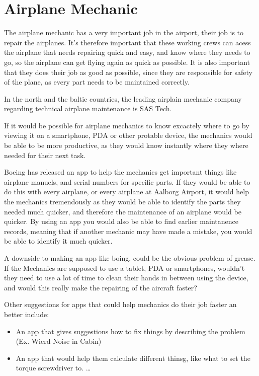 \section{Airplane Mechanic}

The airplane mechanic has a very important job in the airport, their job is to repair the airplanes. It's therefore important that these working crews can acess the airplane that needs repairing quick and easy, and know where they needs to go, so the airplane can get flying again as quick as possible. It is also important that they does their job as good as possible, since they are responsible for safety of the plane, as every part needs to be maintained correctly.

In the north and the baltic countries, the leading airplain mechanic company regarding technical airplane maintenance is SAS Tech.\cite{sas_tech_mechanic}

If it would be possible for airplane mechanics to know excactely where to go by viewing it on a smartphone, PDA or other protable device, the mechanics would be able to be more productive, as they would know instantly where they where needed for their next task.

Boeing has released an app to help the mechanics get important things like airplane manuels, and serial numbers for specific parts. If they would be able to do this with every airplane, or every airplane at Aalborg Airport, it would help the mechanics tremendously as they would be able to identify the parts they needed much quicker, and therefore the maintenance of an airplane would be quicker. By using an app you would also be able to find earlier maintanence records, meaning that if another mechanic may have made a mistake, you would be able to identify it much quicker.\cite{cnet_boeing_app}

A downside to making an app like boing, could be the obvious problem of grease. If the Mechanics are supposed to use a tablet, PDA or smartphones, wouldn't they need to use a lot of time to clean their hands in between using the device, and would this really make the repairing of the aircraft faster?

Other suggestions for apps that could help mechanics do their job faster an better include:
\begin{itemize}
\item An app that gives suggestions how to fix things by describing the problem (Ex. Wierd Noise in Cabin)
\item An app that would help them calculate different thinsg, like what to set the torque screwdriver to. \ldots
\end{itemize}
